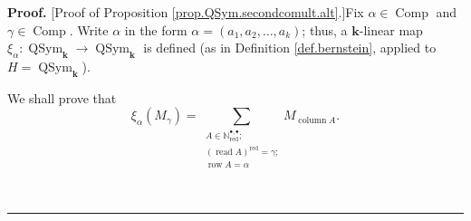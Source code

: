 \documentclass[numbers=enddot,12pt,final,onecolumn,notitlepage,abstracton]{scrartcl}%
\theoremstyle{definition}
\newenvironment{proof}[1][Proof]{\noindent\textbf{#1.} }{\ \rule{0.5em}{0.5em}}
\let\sumnonlimits\sum
\renewcommand{\sum}{\sumnonlimits\limits}
\begin{document}
\begin{proof}
[Proof of Proposition \ref{prop.QSym.secondcomult.alt}.]Fix $\alpha
\in\operatorname*{Comp}$ and $\gamma\in\operatorname*{Comp}$. Write $\alpha$
in the form $\alpha=\left(  a_{1},a_{2},\ldots,a_{k}\right)  $; thus, a
$\mathbf{k}$-linear map $\xi_{\alpha}:\operatorname*{QSym}%
\nolimits_{\mathbf{k}}\rightarrow\operatorname*{QSym}\nolimits_{\mathbf{k}}$
is defined (as in Definition \ref{def.bernstein}, applied to
$H=\operatorname*{QSym}\nolimits_{\mathbf{k}}$).

We shall prove that
\begin{equation}
\xi_{\alpha}\left(  M_{\gamma}\right)  =\sum_{\substack{A\in\mathbb{N}%
_{\operatorname*{red}}^{\bullet,\bullet}\text{;}\\\left(  \operatorname*{read}%
A\right)  ^{\operatorname*{red}}=\gamma\text{;}\\\operatorname*{row}A=\alpha
}}M_{\operatorname*{column}A}. \label{pf.prop.QSym.secondcomult.alt.4}%
\end{equation}



\end{proof}
\end{document}
